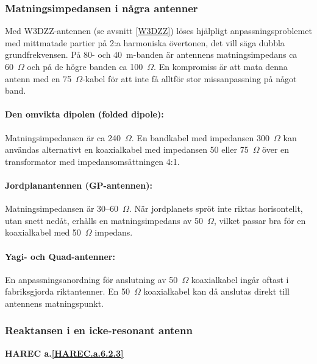 \subsubsection{Matningsimpedansen i några antenner}

Med W3DZZ-antennen (se avsnitt \ref{W3DZZ}) löses hjälpligt anpassningsproblemet
med mittmatade partier på 2:a harmoniska övertonen, det vill säga dubbla
grundfrekvensen.
På 80- och 40~m-banden är antennens matningsimpedans ca 60~\(\Omega\) och på de
högre banden ca 100~\(\Omega\).
En kompromiss är att mata denna antenn med en 75~\(\Omega\)-kabel för att inte
få alltför stor missanpassning på något band.

\paragraph{Den omvikta dipolen (folded dipole):}

Matningsimpedansen är ca 240~\(\Omega\).
En bandkabel med impedansen 300~\(\Omega\) kan användas alternativt en
koaxialkabel med impedansen 50 eller 75~\(\Omega\) över en transformator med
impedansomsättningen 4:1.

\paragraph{Jordplanantennen (GP-antennen):}

Matningsimpedansen är 30--60~\(\Omega\).
När jordplanets spröt inte riktas horisontellt, utan snett nedåt, erhålls en
matningsimpedans av 50~\(\Omega\), vilket passar bra för en koaxialkabel med
50~\(\Omega\) impedans.

\paragraph{Yagi- och Quad-antenner:}

En anpassningsanordning för anslutning av 50~\(\Omega\) koaxialkabel ingår
oftast i fabriksgjorda riktantenner.
En 50~\(\Omega\) koaxialkabel kan då anslutas direkt till antennens matningspunkt.

\subsubsection{Reaktansen i en icke-resonant antenn}
\textbf{
HAREC a.\ref{HAREC.a.6.2.3}\label{myHAREC.a.6.2.3}
}

